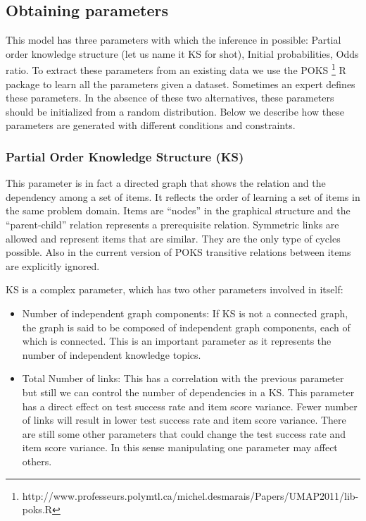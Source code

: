 \subsection{Obtaining parameters}
This model has three parameters with which the inference in possible: Partial order knowledge structure (let us name it KS for shot), Initial probabilities, Odds ratio. To extract these parameters from an existing data we use the POKS \footnote{http://www.professeurs.polymtl.ca/michel.desmarais/Papers/UMAP2011/lib-poks.R} R package to learn all the parameters given a dataset. Sometimes an expert defines these parameters. In the absence of these two alternatives, these parameters should be initialized from a random distribution. Below we describe how these parameters are generated with different conditions and constraints.

\subsubsection{Partial Order Knowledge Structure (KS)}
This parameter is in fact a directed graph that shows the relation and the dependency among a set of items. It reflects the order of learning a set of items in the same problem domain. Items are ``nodes'' in the graphical structure and the ``parent-child'' relation represents a prerequisite relation.  Symmetric links are allowed and represent items that are similar.  They are the only type of cycles possible. Also in the current version of POKS transitive relations between items are explicitly ignored. 

KS is a complex parameter, which has two other parameters involved in itself:
\begin{itemize}
\item Number of independent graph components: If KS is not a connected graph, the graph is said to be composed of independent graph components, each of which is connected.  This is an important parameter as it represents the number of independent knowledge topics.
\item Total Number of links: This has a correlation with the previous parameter but still we can control the number of dependencies in a KS. This parameter has a direct effect on test success rate and item score variance. Fewer number of links will result in lower test success rate and item score variance. There are still some other parameters that could change the test success rate and item score variance. In this sense manipulating one parameter may affect others.
\end{itemize} 

